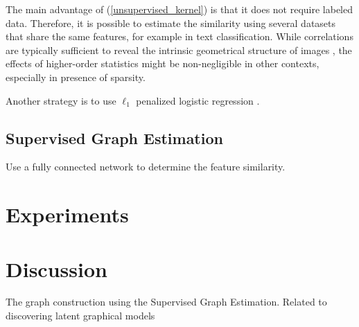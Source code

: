 \documentclass{article} %
\begin{document}
The main advantage of (\ref{unsupervised_kernel}) is that it does not require labeled data. Therefore, it is possible to estimate 
the similarity using several datasets that share the same features, for example in text classification. 
While correlations are typically sufficient to reveal the intrinsic geometrical structure of images \cite{bengioleroux}, 
 the effects of higher-order statistics might be non-negligible in other contexts, especially in presence of sparsity. 

Another strategy is to use $\ell_1$ penalized logistic regression \cite{martin}. 

\subsection{ Supervised Graph Estimation }

Use a fully connected network to determine the feature similarity. 


\section{ Experiments }


\section{Discussion}

The graph construction using the Supervised Graph Estimation. 
Related to discovering latent graphical models


{}

\end{document}
